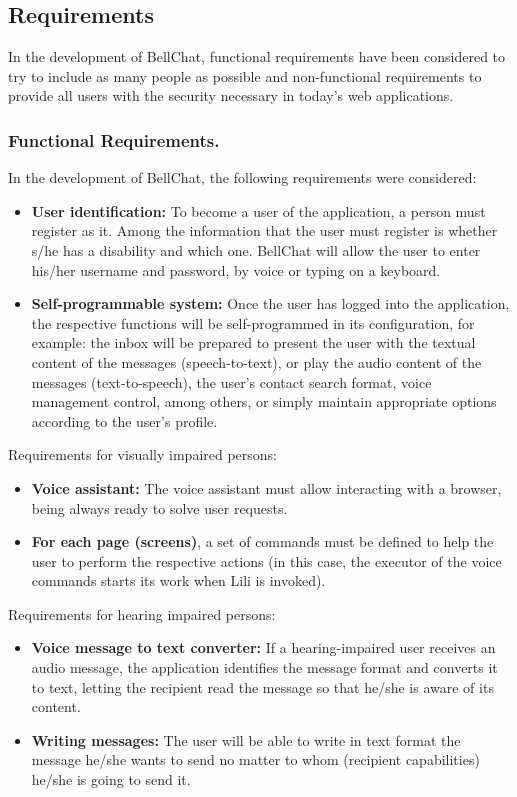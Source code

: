 \documentclass{svproc}
\begin{document}
\subsection{Requirements}

In the development of BellChat, functional requirements have been considered to try to include as many people as possible and non-functional requirements to provide all users with the security necessary in today's web applications.

\subsubsection{Functional Requirements.} In the development of BellChat, the following requirements were considered:

\begin{itemize}
	\item \textbf{User identification:} To become a user of the application, a person must register as it. Among the information that the user must register is whether s/he has a disability and which one. BellChat will allow the user to enter his/her username and password, by voice or typing on a keyboard.
	\item \textbf{Self-programmable system:} Once the user has logged into the application, the respective functions will be self-programmed in its configuration, for example: the inbox will be prepared to present the user with the textual content of the messages (speech-to-text), or play the audio content of the messages (text-to-speech), the user's contact search format, voice management control, among others, or simply maintain appropriate options according to the user's profile.
\end{itemize}

Requirements for visually impaired persons:

\begin{itemize}
	\item \textbf{Voice assistant: }The voice assistant must allow interacting with a browser, being always ready to solve user requests.
	\item \textbf{For each page (screens)}, a set of commands must be defined to help the user to perform the respective actions (in this case, the executor of the voice commands starts its work when Lili is invoked).
\end{itemize}

Requirements for hearing impaired persons: 

\begin{itemize}
	\item \textbf{Voice message to text converter:} If a hearing-impaired user receives an audio message, the application identifies the message format and converts it to text, letting the recipient read the message so that he/she is aware of its content.
	\item \textbf{Writing messages:} The user will be able to write in text format the message he/she wants to send no matter to whom (recipient capabilities) he/she is going to send it.
\end{itemize}
\end{document}
